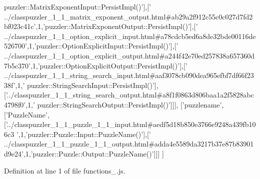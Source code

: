 \begin{DoxyCode}
{      puzzler::MatrixExponentInput::PersistImpl()'}],[\textcolor{stringliteral}{'
      ../classpuzzler\_1\_1\_matrix\_exponent\_output.html#ab29a2f912c55c0c027d7fd2bf023c41c'},1,\textcolor{stringliteral}{'puzzler::MatrixExponentOutput::PersistImpl()'}],[\textcolor{stringliteral}{'
      ../classpuzzler\_1\_1\_option\_explicit\_input.html#a78cdcb5ed6a8de32bde00116de526700'},1,\textcolor{stringliteral}{'puzzler::OptionExplicitInput::PersistImpl()'}],[\textcolor{stringliteral}{'
      ../classpuzzler\_1\_1\_option\_explicit\_output.html#a244f42e70ed257838a657360d7b5c370'},1,\textcolor{stringliteral}{'puzzler::OptionExplicitOutput::PersistImpl()'}],[\textcolor{stringliteral}{'
      ../classpuzzler\_1\_1\_string\_search\_input.html#aaf3078cb090dea965efbf7df66f2338f'},1,\textcolor{stringliteral}{'
      puzzler::StringSearchInput::PersistImpl()'}],[\textcolor{stringliteral}{'../classpuzzler\_1\_1\_string\_search\_output.html#a8f1f0863d806baa1a2f5828abc4798f0'},1,\textcolor{stringliteral}{'
      puzzler::StringSearchOutput::PersistImpl()'}]]],
  [\textcolor{stringliteral}{'puzzlename'},[\textcolor{stringliteral}{'PuzzleName'},[\textcolor{stringliteral}{'../classpuzzler\_1\_1\_puzzle\_1\_1\_input.html#aedf5d18b850e3766e9248a439fb106c3
      '},1,\textcolor{stringliteral}{'puzzler::Puzzle::Input::PuzzleName()'}],[\textcolor{stringliteral}{'
      ../classpuzzler\_1\_1\_puzzle\_1\_1\_output.html#adda4e5589da3217b37e87b83901d9e24'},1,\textcolor{stringliteral}{'puzzler::Puzzle::Output::PuzzleName()'}]]]
]
\end{DoxyCode}


Definition at line 1 of file functions\+\_.\+js.

